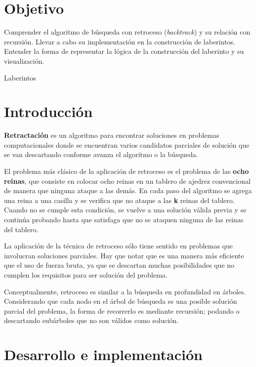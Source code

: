 

\section{Objetivo}
Comprender el algoritmo de búsqueda con retroceso (\textit{backtrack}) y su relación con recursión. Llevar a cabo su implementación en la construcción de laberintos. Entender la forma de representar la lógica de la construcción del laberinto y su visualización. \par


\begin{auxcode}
 \caption{Laberintos}
 \centering
\end{auxcode}

\section{Introducci\'on}
\textbf{Retractación} es un algoritmo para encontrar soluciones en problemas computacionales donde se encuentran varios candidatos parciales de solución que se van descartando conforme avanza el algoritmo o la búsqueda.

El problema más clásico de la aplicación de retroceso es el problema de las \textbf{ocho reinas}, que consiste en colocar ocho reinas en un tablero de ajedrez convencional de manera que ninguna ataque a las demás. En cada paso del algoritmo se agrega una reina a una casilla y se verifica que no ataque a las \textbf{k} reinas del tablero. Cuando no se cumple esta condición, se vuelve a una solución válida previa y se continúa probando hasta que satisfaga que no se ataquen ninguna de las reinas del tablero.\par

La aplicación de la técnica de retroceso sólo tiene sentido en problemas que involucran soluciones parciales. Hay que notar que es una manera más eficiente que el uso de fuerza bruta, ya que se descartan muchas posibilidades que no cumplen los requisitos para ser solución del problema.

Conceptualmente, retroceso es similar a la búsqueda en profundidad en árboles. Considerando que cada nodo en el árbol de búsqueda es una posible solución parcial del problema, la forma de recorrerlo es mediante recursión; podando o descartando subárboles que no son válidos como solución.\par


\section{Desarrollo e implementaci\'on}

